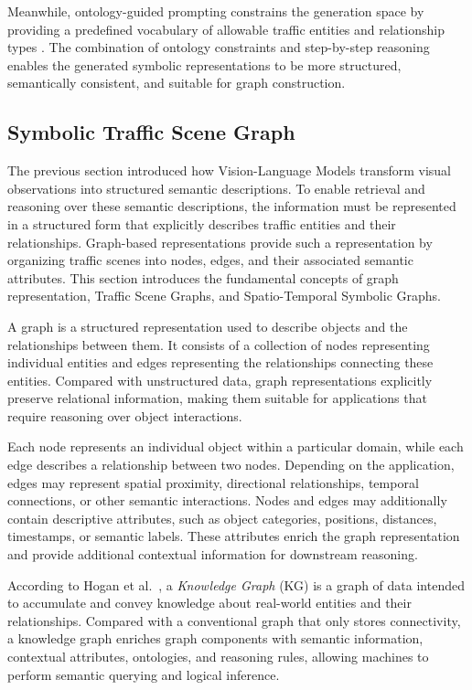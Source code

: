 \documentclass[a4paper, 11pt]{article} %
\begin{document}
Meanwhile, ontology-guided prompting constrains the generation space by providing a predefined vocabulary of allowable traffic entities and relationship types \cite{tian2025query}. The combination of ontology constraints and step-by-step reasoning enables the generated symbolic representations to be more structured, semantically consistent, and suitable for graph construction.

\subsection{Symbolic Traffic Scene Graph}

The previous section introduced how Vision-Language Models transform visual observations into structured semantic descriptions. To enable retrieval and reasoning over these semantic descriptions, the information must be represented in a structured form that explicitly describes traffic entities and their relationships. Graph-based representations provide such a representation by organizing traffic scenes into nodes, edges, and their associated semantic attributes. This section introduces the fundamental concepts of graph representation, Traffic Scene Graphs, and Spatio-Temporal Symbolic Graphs.

A graph is a structured representation used to describe objects and the relationships between them. It consists of a collection of nodes representing individual entities and edges representing the relationships connecting these entities. Compared with unstructured data, graph representations explicitly preserve relational information, making them suitable for applications that require reasoning over object interactions.

Each node represents an individual object within a particular domain, while each edge describes a relationship between two nodes. Depending on the application, edges may represent spatial proximity, directional relationships, temporal connections, or other semantic interactions. Nodes and edges may additionally contain descriptive attributes, such as object categories, positions, distances, timestamps, or semantic labels. These attributes enrich the graph representation and provide additional contextual information for downstream reasoning.

According to Hogan et al.~\cite{hogan2021knowledge}, a \textit{Knowledge Graph} (KG) is a graph of data intended to accumulate and convey knowledge about real-world entities and their relationships. Compared with a conventional graph that only stores connectivity, a knowledge graph enriches graph components with semantic information, contextual attributes, ontologies, and reasoning rules, allowing machines to perform semantic querying and logical inference.
\end{document}
